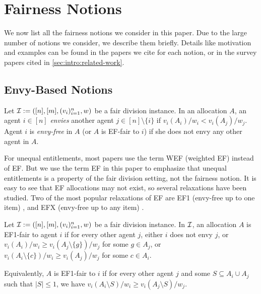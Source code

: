 \section{Fairness Notions}
\label{sec:notions}

We now list all the fairness notions we consider in this paper.
Due to the large number of notions we consider, we describe them briefly.
Details like motivation and examples can be found in the papers we cite for each notion,
or in the survey papers cited in \cref{sec:intro:related-work}.

\subsection{Envy-Based Notions}

\begin{definition}[EF]
\label{defn:ef}
Let $\mathcal{I} := ([n],\allowbreak [m],\allowbreak (v_i)_{i=1}^n,\allowbreak w)$ be a fair division instance.
In an allocation $A$, an agent $i \in [n]$ \emph{envies} another agent
$j \in [n] \setminus \{i\}$ if $v_i(A_i)/w_i < v_i(A_j)/w_j$.
Agent $i$ is \emph{envy-free} in $A$ (or $A$ is EF-fair to $i$) if
she does not envy any other agent in $A$.
\end{definition}

For unequal entitlements, most papers use the term WEF (weighted EF) instead of EF.
But we use the term EF in this paper to emphasize that unequal entitlements
is a property of the fair division setting, not the fairness notion.
%
It is easy to see that EF allocations may not exist, so several relaxations have been studied.
Two of the most popular relaxations of EF are
EF1 (envy-free up to one item) \citep{budish2011combinatorial,lipton2004approximately},
and EFX (envy-free up to any item) \citep{caragiannis2019unreasonable}.

\begin{definition}[EF1]
\label{defn:ef1}
Let $\mathcal{I} := ([n],\allowbreak [m],\allowbreak (v_i)_{i=1}^n,\allowbreak w)$ be a fair division instance.
In $\mathcal{I}$, an allocation $A$ is EF1-fair to agent $i$ if for every other agent $j$,
either $i$ does not envy $j$,
or $v_i(A_i)/w_i \ge v_i(A_j \setminus \{g\})/w_j$ for some $g \in A_j$,
or $v_i(A_i \setminus \{c\})/w_i \ge v_i(A_j)/w_j$ for some $c \in A_i$.

Equivalently, $A$ is EF1-fair to $i$ if for every other agent $j$
and some $S \subseteq A_i \cup A_j$ such that $|S| \le 1$, we have
$v_i(A_i \setminus S)/w_i \ge v_i(A_j \setminus S)/w_j$.
\end{definition}

